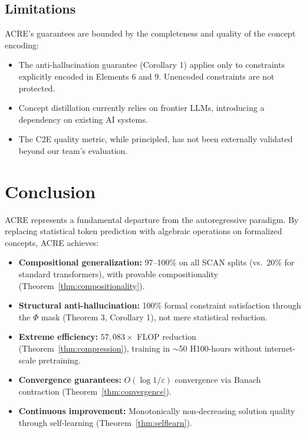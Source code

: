 \documentclass{article}
\begin{document}
\subsection{Limitations}

ACRE's guarantees are bounded by the completeness and quality of the concept encoding:
\begin{itemize}[leftmargin=*]
    \item The anti-hallucination guarantee (Corollary 1) applies only to constraints explicitly encoded in Elements 6 and 9. Unencoded constraints are not protected.
    \item Concept distillation currently relies on frontier LLMs, introducing a dependency on existing AI systems.
    \item The C2E quality metric, while principled, has not been externally validated beyond our team's evaluation.
\end{itemize}

\section{Conclusion}

ACRE represents a fundamental departure from the autoregressive paradigm. By replacing statistical token prediction with algebraic operations on formalized concepts, ACRE achieves:

\begin{itemize}[leftmargin=*]
    \item \textbf{Compositional generalization:} 97--100\% on all SCAN splits (vs.\ 20\% for standard transformers), with provable compositionality (Theorem~\ref{thm:compositionality}).
    \item \textbf{Structural anti-hallucination:} 100\% formal constraint satisfaction through the $\Phi$ mask (Theorem 3, Corollary 1), not mere statistical reduction.
    \item \textbf{Extreme efficiency:} $57{,}083\times$ FLOP reduction (Theorem~\ref{thm:compression}), training in $\sim$50 H100-hours without internet-scale pretraining.
    \item \textbf{Convergence guarantees:} $O(\log 1/\varepsilon)$ convergence via Banach contraction (Theorem~\ref{thm:convergence}).
    \item \textbf{Continuous improvement:} Monotonically non-decreasing solution quality through self-learning (Theorem~\ref{thm:selflearn}).
\end{itemize}
\end{document}
